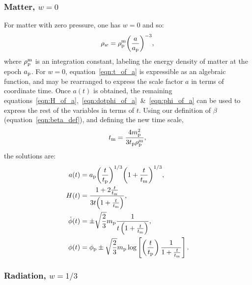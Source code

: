 \subsubsection{Matter, $w=0$}
For matter with zero pressure, one has $w=0$ and so:
%
\begin{equation}
  \rho_w = \rho_{\mathrm{p}}^{\mathrm{m}}{\left(\frac{a}{a_{\mathrm{p}}}\right)}^{-3},
\end{equation}
%
where $\rho_{\mathrm{p}}^{\mathrm{m}}$ is an integration constant, labeling the energy density of matter at the epoch $a_{\mathrm{p}}$.  For $w=0$, equation~\eqref{eqn:t_of_a} is expressible as an algebraic function, and may be rearranged to express the scale factor $a$ in terms of coordinate time. Once $a(t)$ is obtained, the remaining equations~\eqref{eqn:H_of_a},~\eqref{eqn:dotphi_of_a}~\&~\eqref{eqn:phi_of_a} can be used to express the rest of the variables in terms of $t$. Using our definition of $\beta$ (equation~\ref{eqn:beta_def}), and defining the new time scale,
%
\begin{equation}
  t_{\mathrm{m}} = \frac{4m_{\mathrm{p}}^2}{3t_{\mathrm{p}}\rho_{\mathrm{p}}^{\mathrm{m}} },
  \label{eqn:tm}
\end{equation}
the solutions are:
%
\begin{align}
  a(t)
  &=
  a_{\mathrm{p}}{\left(\frac{t}{t_{\mathrm{p}}}\right)}^{1/3}
  {\left(1+\frac{t}{t_{\mathrm{m}}}\right)}^{1/3} ,
  \\
  H(t) &= 
  \frac{1+2\frac{t}{t_{\mathrm{m}}}}{3t{{\left( 1+\frac{t}{t_{\mathrm{m}}} \right) }}},
  \\
  \dot{\phi}(t) &= 
  \pm\sqrt{\frac{2}{3}}m_{\mathrm{p}}
  \frac{1}
  {t \left( 1+\frac{t}{t_{\mathrm{m}}} \right) },
  \\
  \phi(t) &=
  \phi_{\mathrm{p}} \pm \sqrt{\frac{2}{3}}m_{\mathrm{p}} \log\left[  
  \left(\frac{t}{t_{\mathrm{p}}}\right) 
  \frac {1}{1+\frac{t}{t_{\mathrm{m}}}}  
  \right].
\end{align}
%




\subsubsection{Radiation, $w=1/3$}

